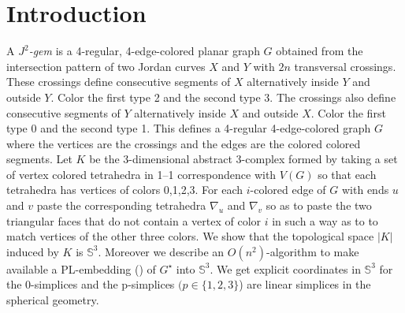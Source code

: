 

\section{Introduction}
A {\em $J^ 2$-gem} is a 4-regular, 4-edge-colored planar graph $G$ obtained from the
intersection pattern of two Jordan curves $X$ and $Y$ with $2n$ transversal
crossings.
These crossings define consecutive segments of $X$ alternatively 
inside $Y$ and outside $Y$. Color the first type 2 and the second type 3.
The crossings also define consecutive segments of $Y$ alternatively 
inside $X$ and outside $X$. Color the first type 0 and the second type 1.
This defines a 4-regular 4-edge-colored graph $G$ where the vertices are the crossings
and the edges are the colored colored segments.
Let $K$ be the 3-dimensional abstract 3-complex formed by taking a set of 
vertex colored tetrahedra in 1--1 correspondence with $V(G)$ so that each tetrahedra
has vertices of colors 0,1,2,3. For each $i$-colored edge of $G$ with ends $u$ and $v$
paste the corresponding tetrahedra $\nabla_u$ and $\nabla_v$ so as to paste the two triangular
faces that do not contain a vertex of color $i$ in such a way as to
to match vertices of the other three colors. 
We show that the topological space 
$|K|$ induced by $K$ is $\mathbb{S}^ 3$. Moreover we describe an $O(n^2)$-algorithm
to make available a PL-embedding (\cite{rourke1982introduction}) of $G^\star$ 
into $\mathbb{S}^3$. We get explicit coordinates in $\mathbb{S}^ 3$ for the 0-simplices and
the p-simplices $(p \in \{1,2,3\}$) are linear simplices in the spherical geometry.


